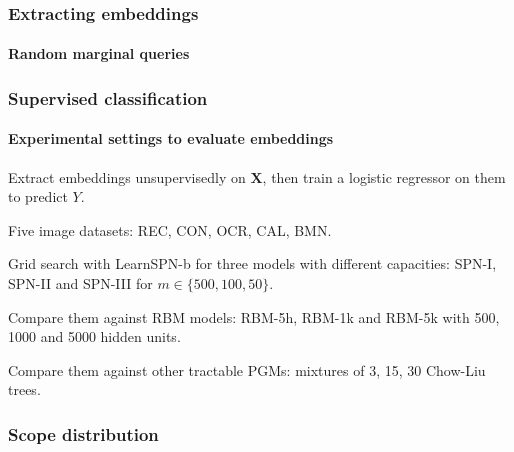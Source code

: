 \documentclass[10pt, t, xcolor={usenames,dvipsnames,svgnames}, compress]{beamer}
\begin{document}
\begin{frame}
  \frametitle{Extracting embeddings}
  \framesubtitle{Random marginal queries}
\end{frame}


\begin{frame}
  \frametitle{Supervised classification}
  \framesubtitle{Experimental settings to evaluate embeddings}

  Extract embeddings unsupervisedly on $\mathbf{X}$, then train a
  logistic regressor on them to predict $Y$.\par\bigskip
  
  Five image datasets: \textsf{REC}, \textsf{CON}, \textsf{OCR},
  \textsf{CAL}, \textsf{BMN}.\par\bigskip
  
  Grid search with \textsf{LearnSPN-b} for three models with different
  capacities:
  \textsf{SPN-I}, \textsf{SPN-II} and \textsf{SPN-III} for $m\in\{500,100,50\}$.\par\bigskip

  Compare them against RBM models: \textsf{RBM-5h}, \textsf{RBM-1k}
  and \textsf{RBM-5k} with 500, 1000 and 5000 hidden
  units.\par\bigskip

  Compare them against other tractable PGMs: mixtures of 3, 15, 30
  Chow-Liu trees.
\end{frame}

\begin{frame}
  \frametitle{Scope distribution}
  
\end{frame}
\end{document}
